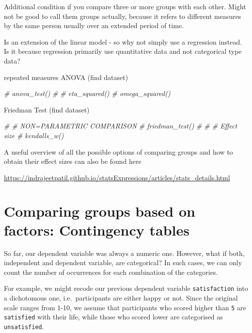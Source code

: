 \documentclass[
]{book}
\newenvironment{Shaded}{\begin{snugshade}}{\end{snugshade}}
\newcommand{\CommentTok}[1]{\textcolor[rgb]{0.56,0.35,0.01}{\textit{#1}}}
\begin{document}
Additional condition if you compare three or more groups with each other. Might not be good to call them groups actually, because it refers to different measures by the same person usually over an extended period of time.

Is an extension of the linear model - so why not simply use a regression instead. Is it because regression primarily use quantitative data and not categorical type data?

repeated measures ANOVA (find dataset)

\begin{Shaded}
\begin{Highlighting}[]
\CommentTok{\# anova\_test()}
\CommentTok{\# }
\CommentTok{\# eta\_squared()}
\CommentTok{\# omega\_squared()}
\end{Highlighting}
\end{Shaded}

Friedman Test (find dataset)

\begin{Shaded}
\begin{Highlighting}[]
\CommentTok{\# \# NON=PARAMETRIC COMPARISON}
\CommentTok{\# friedman\_test()}
\CommentTok{\# }
\CommentTok{\# \# Effect size}
\CommentTok{\# kendalls\_w()}
\end{Highlighting}
\end{Shaded}

A useful overview of all the possible options of comparing groups and how to obtain their effect sizes can also be found here

\url{https://indrajeetpatil.github.io/statsExpressions/articles/stats_details.html}

\hypertarget{chi-squared-test}{%
\section{Comparing groups based on factors: Contingency tables}\label{chi-squared-test}}

So far, our dependent variable was always a numeric one. However, what if both, independent and dependent variable, are categorical? In such cases, we can only count the number of occurrences for each combination of the categories.

For example, we might recode our previous dependent variable \texttt{satisfaction} into a dichotomous one, i.e.~participants are either happy or not. Since the original scale ranges from 1-10, we assume that participants who scored higher than \texttt{5} are \texttt{satisfied} with their life, while those who scored lower are categorised as \texttt{unsatisfied}.
\end{document}
